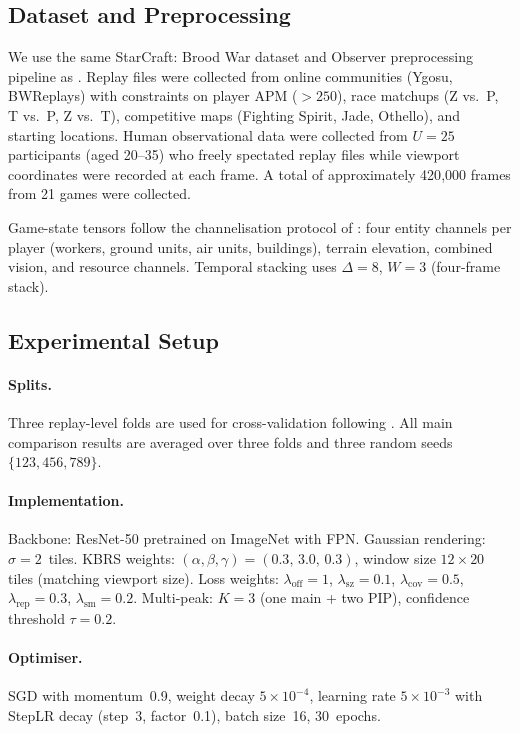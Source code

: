 \documentclass[preprint,12pt]{elsarticle}
\begin{document}
\subsection{Dataset and Preprocessing}

We use the same StarCraft: Brood War dataset and Observer preprocessing 
pipeline as \cite{joo2023learning, anonymous2025kbrs}. Replay files were 
collected from online communities (Ygosu, BWReplays) with constraints on 
player APM ($>250$), race matchups (Z vs.~P, T vs.~P, Z vs.~T), competitive 
maps (Fighting Spirit, Jade, Othello), and starting locations. Human 
observational data were collected from $U=25$ participants (aged 20--35) who 
freely spectated replay files while viewport coordinates were recorded at each 
frame. A total of approximately 420{,}000 frames from 21 games were collected.

Game-state tensors follow the channelisation protocol of \cite{bae2025observer}: 
four entity channels per player (workers, ground units, air units, buildings), 
terrain elevation, combined vision, and resource channels. Temporal stacking 
uses $\Delta=8$, $W=3$ (four-frame stack).

\subsection{Experimental Setup}

\paragraph{Splits.} Three replay-level folds are used for cross-validation 
following \cite{joo2023learning, anonymous2025kbrs}. All main comparison 
results are averaged over three folds and three random seeds 
$\{123, 456, 789\}$.

\paragraph{Implementation.} Backbone: ResNet-50 pretrained on ImageNet with 
FPN. Gaussian rendering: $\sigma = 2$~tiles. KBRS weights: 
$(\alpha,\beta,\gamma) = (0.3,\, 3.0,\, 0.3)$, window size $12{\times}20$ 
tiles (matching viewport size). Loss weights: $\lambda_{\text{off}}=1$, 
$\lambda_{\text{sz}}=0.1$, $\lambda_{\text{cov}}=0.5$, 
$\lambda_{\text{rep}}=0.3$, $\lambda_{\text{sm}}=0.2$. Multi-peak: $K=3$ 
(one main + two PIP), confidence threshold $\tau=0.2$.

\paragraph{Optimiser.} SGD with momentum~0.9, weight decay $5{\times}10^{-4}$, 
learning rate $5{\times}10^{-3}$ with StepLR decay (step~3, factor~0.1), 
batch size~16, 30~epochs.
\end{document}
